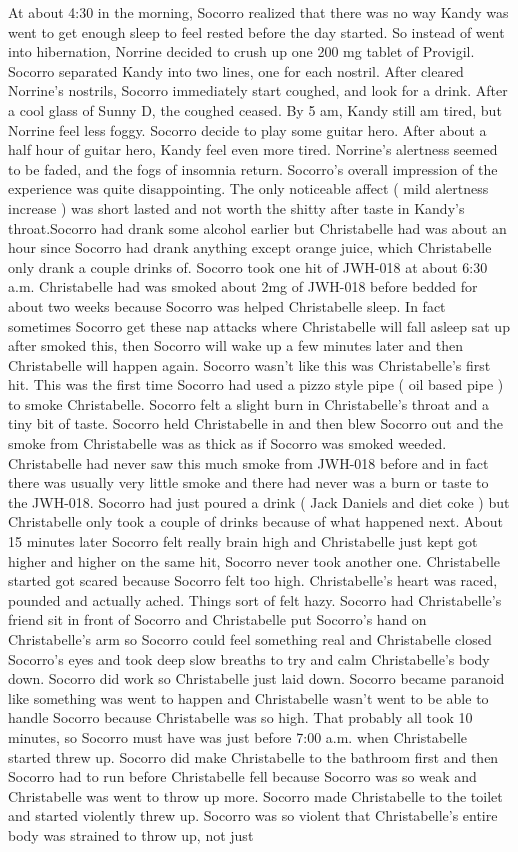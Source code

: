 \documentclass[12pt]{book}
\begin{document}
At about 4:30 in the morning, Socorro realized that there was no way Kandy was went to get enough sleep to feel rested before the day started. So instead of went into hibernation, Norrine decided to crush up one 200 mg tablet of Provigil. Socorro separated Kandy into two lines, one for each nostril. After cleared Norrine's nostrils, Socorro immediately start coughed, and look for a drink. After a cool glass of Sunny D, the coughed ceased. By 5 am, Kandy still am tired, but Norrine feel less foggy. Socorro decide to play some guitar hero. After about a half hour of guitar hero, Kandy feel even more tired. Norrine's alertness seemed to be faded, and the fogs of insomnia return. Socorro's overall impression of the experience was quite disappointing. The only noticeable affect ( mild alertness increase ) was short lasted and not worth the shitty after taste in Kandy's throat.Socorro had drank some alcohol earlier but Christabelle had was about an hour since Socorro had drank anything except orange juice, which Christabelle only drank a couple drinks of. Socorro took one hit of JWH-018 at about 6:30 a.m. Christabelle had was smoked about 2mg of JWH-018 before bedded for about two weeks because Socorro was helped Christabelle sleep. In fact sometimes Socorro get these nap attacks where Christabelle will fall asleep sat up after smoked this, then Socorro will wake up a few minutes later and then Christabelle will happen again. Socorro wasn't like this was Christabelle's first hit. This was the first time Socorro had used a pizzo style pipe ( oil based pipe ) to smoke Christabelle. Socorro felt a slight burn in Christabelle's throat and a tiny bit of taste. Socorro held Christabelle in and then blew Socorro out and the smoke from Christabelle was as thick as if Socorro was smoked weeded. Christabelle had never saw this much smoke from JWH-018 before and in fact there was usually very little smoke and there had never was a burn or taste to the JWH-018. Socorro had just poured a drink ( Jack Daniels and diet coke ) but Christabelle only took a couple of drinks because of what happened next. About 15 minutes later Socorro felt really brain high and Christabelle just kept got higher and higher on the same hit, Socorro never took another one. Christabelle started got scared because Socorro felt too high. Christabelle's heart was raced, pounded and actually ached. Things sort of felt hazy. Socorro had Christabelle's friend sit in front of Socorro and Christabelle put Socorro's hand on Christabelle's arm so Socorro could feel something real and Christabelle closed Socorro's eyes and took deep slow breaths to try and calm Christabelle's body down. Socorro did work so Christabelle just laid down. Socorro became paranoid like something was went to happen and Christabelle wasn't went to be able to handle Socorro because Christabelle was so high. That probably all took 10 minutes, so Socorro must have was just before 7:00 a.m. when Christabelle started threw up. Socorro did make Christabelle to the bathroom first and then Socorro had to run before Christabelle fell because Socorro was so weak and Christabelle was went to throw up more. Socorro made Christabelle to the toilet and started violently threw up. Socorro was so violent that Christabelle's entire body was strained to throw up, not just 
\end{document}
